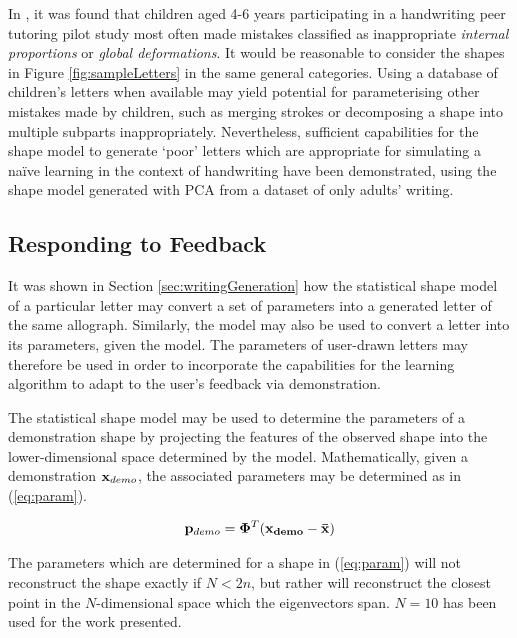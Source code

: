 \documentclass{sig-alternate}
\begin{document}
In \cite{Chandra2013}, it was found that children aged 4-6 years participating
in a handwriting peer tutoring pilot study most often made mistakes classified
as inappropriate \emph{internal proportions} or \emph{global deformations}. It
would be reasonable to consider the shapes in Figure \ref{fig:sampleLetters} in
the same general categories. Using a database of children's letters when
available may yield potential for parameterising other mistakes made by
children, such as merging strokes or decomposing a shape into multiple subparts
inappropriately. Nevertheless, sufficient capabilities for the shape model to
generate `poor' letters which are appropriate for simulating a na\"ive learning
in the context of handwriting have been demonstrated, using the shape model
generated with PCA from a dataset of only adults' writing.


\subsection{Responding to Feedback}

It was shown in Section \ref{sec:writingGeneration} how the statistical shape
model of a particular letter may convert a set of parameters into a generated
letter of the same allograph. Similarly, the model may also be used to convert a
letter into its parameters, given the model. The parameters of user-drawn
letters may therefore be used in order to incorporate the capabilities for the
learning algorithm to adapt to the user's feedback via demonstration.

The statistical shape model may be used to determine the parameters of a
demonstration shape by projecting the features of the observed shape into the
lower-dimensional space determined by the model. Mathematically, given a
demonstration ${\bf x}_{demo}$, the associated parameters may be determined as in
(\ref{eq:param}).

\begin{equation}\label{eq:param}
{\bf p}_{demo} ={\bf \Phi}^T ({\bf{x}_{demo}-\bar{x}})
\end{equation}

The parameters which are determined for a shape in (\ref{eq:param}) will not
reconstruct the shape exactly if $N<2n$, but rather will reconstruct the closest
point in the $N$-dimensional space which the eigenvectors span. $N=10$ has been
used for the work presented.
\end{document}
